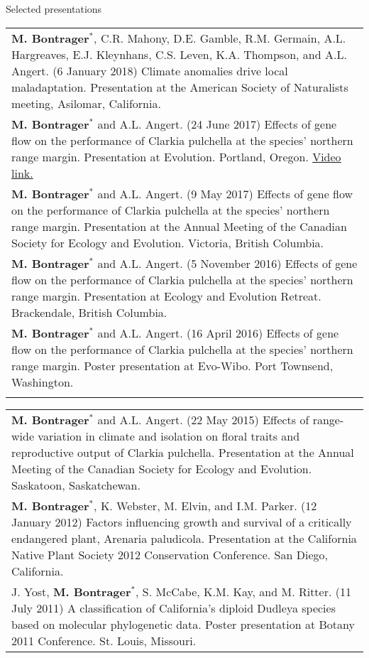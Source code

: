 \documentclass[letterpaper,11pt,oneside]{article}
\begin{document}

\noindent\Large{Selected presentations}  
\normalsize
\bigskip

\def\arraystretch{1.2}
\noindent \begin{tabular}{@{} >{\raggedright\arraybackslash}p{16.51cm}}
\textbf{M. Bontrager}$^{*}$, C.R. Mahony, D.E. Gamble, R.M. Germain, A.L. Hargreaves, E.J. Kleynhans, C.S. Leven, K.A. Thompson, and A.L. Angert. (6 January 2018) Climate anomalies drive local maladaptation. Presentation at the American Society of Naturalists meeting, Asilomar, California. \\
\textbf{M. Bontrager}$^{*}$ and A.L. Angert. (24 June 2017) Effects of gene flow on the performance of Clarkia pulchella at the species’ northern range margin. Presentation at Evolution. Portland, Oregon. \href{https://www.youtube.com/watch?v=HqVgQzIJLyA}{Video link.} \\
\textbf{M. Bontrager}$^{*}$ and A.L. Angert. (9 May 2017) Effects of gene flow on the performance of Clarkia pulchella at the species’ northern range margin. Presentation at the Annual Meeting of the Canadian Society for Ecology and Evolution. Victoria, British Columbia. \\
\textbf{M. Bontrager}$^{*}$ and A.L. Angert. (5 November 2016) Effects of gene flow on the performance of Clarkia pulchella at the species’ northern range margin. Presentation at Ecology and Evolution Retreat. Brackendale, British Columbia. \\
\textbf{M. Bontrager}$^{*}$ and A.L. Angert. (16 April 2016) Effects of gene flow on the performance of Clarkia pulchella at the species’ northern range margin. Poster presentation at Evo-Wibo. Port Townsend, Washington. \\
\def\arraystretch{1.2}
\end{tabular}
\noindent \begin{tabular}{@{} >{\raggedright\arraybackslash}p{16.51cm}}
\textbf{M. Bontrager}$^{*}$ and A.L. Angert. (22 May 2015) Effects of range-wide variation in climate and isolation on floral traits and reproductive output of Clarkia pulchella. Presentation at the Annual Meeting of the Canadian Society for Ecology and Evolution. Saskatoon, Saskatchewan. \\
\textbf{M. Bontrager}$^{*}$, K. Webster, M. Elvin, and I.M. Parker. (12 January 2012) Factors influencing growth and survival of a critically endangered plant, Arenaria paludicola. Presentation at the California Native Plant Society 2012 Conservation Conference. San Diego, California. \\
J. Yost, \textbf{M. Bontrager}$^{*}$, S. McCabe, K.M. Kay, and M. Ritter. (11 July 2011) A classification of California’s diploid Dudleya species based on molecular phylogenetic data. Poster presentation at Botany 2011 Conference. St. Louis, Missouri. \\
\end{tabular}
\end{document}
